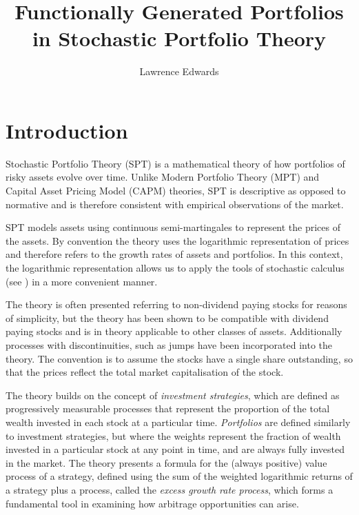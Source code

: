 \documentclass[british]{amsart} \usepackage{lmodern}
\numberwithin{equation}{section} \numberwithin{figure}{section}
\theoremstyle{plain} \newtheorem{thm}{\protect\theoremname}[section]
\theoremstyle{definition} \newtheorem{defn}[thm]{\protect\definitionname}
\theoremstyle{plain} \newtheorem{assumption}[thm]{\protect\assumptionname}
\theoremstyle{plain} \newtheorem{lem}[thm]{\protect\lemmaname}
\theoremstyle{plain} \newtheorem{prop}[thm]{\protect\propositionname}
\theoremstyle{remark} \newtheorem{rem}[thm]{\protect\remarkname}
\theoremstyle{plain} \newtheorem{cor}[thm]{\protect\corollaryname}
\begin{document}
\title{Functionally Generated Portfolios in Stochastic Portfolio Theory}
\author{Lawrence Edwards} \maketitle

\newpage

\tableofcontents{}

\newpage


\section{Introduction}

Stochastic Portfolio Theory (SPT) is a mathematical theory of how portfolios of
risky assets evolve over time. Unlike Modern Portfolio Theory (MPT) and Capital
Asset Pricing Model (CAPM) theories, SPT is descriptive as opposed to normative
and is therefore consistent with empirical observations of the market.

SPT models assets using continuous semi-martingales to represent the prices of
the assets. By convention the theory uses the logarithmic representation of
prices and therefore refers to the growth rates of assets and portfolios. In
this context, the logarithmic representation allows us to apply the tools of
stochastic calculus (see \cite{platen2006}) in a more convenient manner. 

The theory is often presented referring to non-dividend paying stocks for
reasons of simplicity, but the theory has been shown to be compatible with
dividend paying stocks and is in theory applicable to other classes of assets.
Additionally processes with discontinuities, such as jumps have been
incorporated into the theory. The convention is to assume the stocks have a
single share outstanding, so that the prices reflect the total market
capitalisation of the stock.

The theory builds on the concept of \textit{investment strategies}, which are
defined as progressively measurable processes that represent the proportion of
the total wealth invested in each stock at a particular time.
\textit{Portfolios} are defined similarly to investment strategies, but where
the weights represent the fraction of wealth invested in a particular stock at
any point in time, and are always fully invested in the market. The theory
presents a formula for the (always positive) value process of a strategy,
defined using the sum of the weighted logarithmic returns of a strategy plus a
process, called the \textit{excess growth rate process}, which forms a
fundamental tool in examining how arbitrage opportunities can arise.
\end{document}
